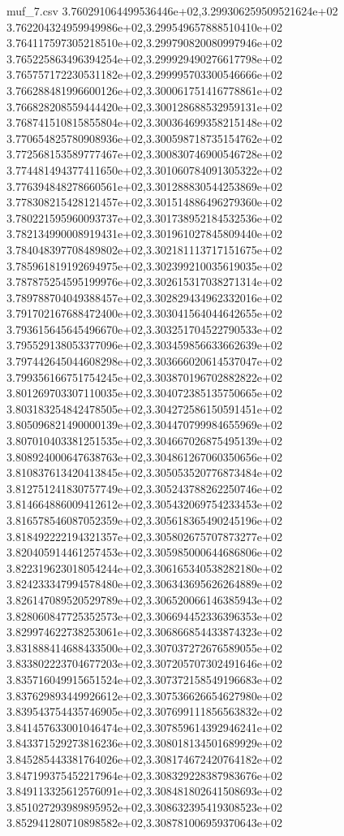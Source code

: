 \begin{filecontents*}{muf_7.csv}
3.760291064499536446e+02,3.299306259509521624e+02
3.762204324959949986e+02,3.299549657888510410e+02
3.764117597305218510e+02,3.299790820080997946e+02
3.765225863496394254e+02,3.299929490276617798e+02
3.765757172230531182e+02,3.299995703300546666e+02
3.766288481996600126e+02,3.300061751416778861e+02
3.766828208559444420e+02,3.300128688532959131e+02
3.768741510815855804e+02,3.300364699358215148e+02
3.770654825780908936e+02,3.300598718735154762e+02
3.772568153589777467e+02,3.300830746900546728e+02
3.774481494377411650e+02,3.301060784091305322e+02
3.776394848278660561e+02,3.301288830544253869e+02
3.778308215428121457e+02,3.301514886496279360e+02
3.780221595960093737e+02,3.301738952184532536e+02
3.782134990008919431e+02,3.301961027845809440e+02
3.784048397708489802e+02,3.302181113717151675e+02
3.785961819192694975e+02,3.302399210035619035e+02
3.787875254595199976e+02,3.302615317038271314e+02
3.789788704049388457e+02,3.302829434962332016e+02
3.791702167688472400e+02,3.303041564044642655e+02
3.793615645645496670e+02,3.303251704522790533e+02
3.795529138053377096e+02,3.303459856633662639e+02
3.797442645044608298e+02,3.303666020614537047e+02
3.799356166751754245e+02,3.303870196702882822e+02
3.801269703307110035e+02,3.304072385135750665e+02
3.803183254842478505e+02,3.304272586150591451e+02
3.805096821490000139e+02,3.304470799984655969e+02
3.807010403381251535e+02,3.304667026875495139e+02
3.808924000647638763e+02,3.304861267060350656e+02
3.810837613420413845e+02,3.305053520776873484e+02
3.812751241830757749e+02,3.305243788262250746e+02
3.814664886009412612e+02,3.305432069754233453e+02
3.816578546087052359e+02,3.305618365490245196e+02
3.818492222194321357e+02,3.305802675707873277e+02
3.820405914461257453e+02,3.305985000644686806e+02
3.822319623018054244e+02,3.306165340538282180e+02
3.824233347994578480e+02,3.306343695626264889e+02
3.826147089520529789e+02,3.306520066146385943e+02
3.828060847725352573e+02,3.306694452336396353e+02
3.829974622738253061e+02,3.306866854433874323e+02
3.831888414688433500e+02,3.307037272676589055e+02
3.833802223704677203e+02,3.307205707302491646e+02
3.835716049915651524e+02,3.307372158549196683e+02
3.837629893449926612e+02,3.307536626654627980e+02
3.839543754435746905e+02,3.307699111856563832e+02
3.841457633001046474e+02,3.307859614392946241e+02
3.843371529273816236e+02,3.308018134501689929e+02
3.845285443381764026e+02,3.308174672420764182e+02
3.847199375452217964e+02,3.308329228387983676e+02
3.849113325612576091e+02,3.308481802641508693e+02
3.851027293989895952e+02,3.308632395419308523e+02
3.852941280710898582e+02,3.308781006959370643e+02

\end{filecontents*}
